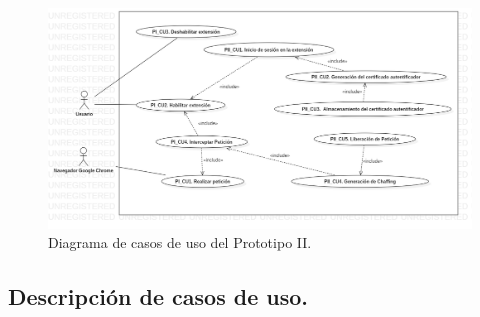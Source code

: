\documentclass[12pt, a4paper, titlepage]{report}
\begin{document}
    			    \begin{figure}[H]
			            \begin{center}			                \includegraphics[width=16cm]{./imagenes/Desarrollo/Prototipo_2/UCD_P2.png}
    						\caption{Diagrama de casos de uso del Prototipo II.}
                        \end{center}    					
    				\end{figure}
			    
		        \subsection{Descripción de casos de uso.}
			    
\end{document}
